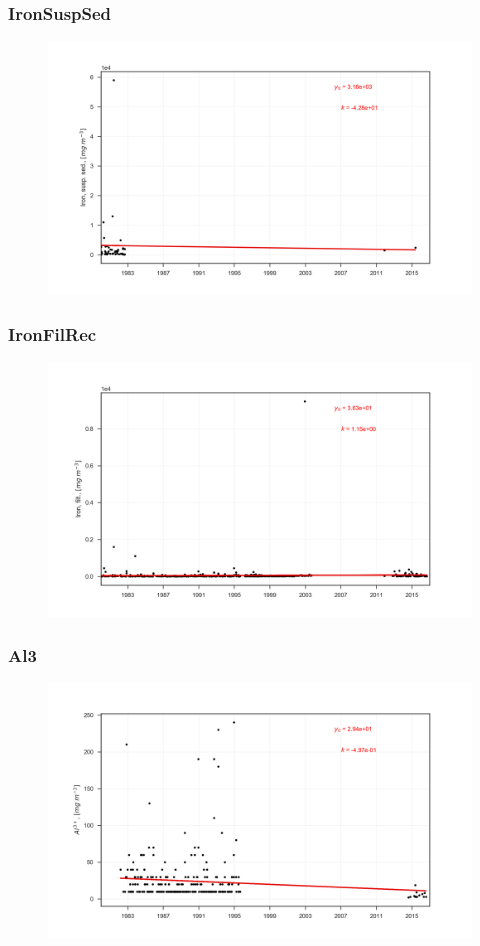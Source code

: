 \documentclass{beamer}
\begin{document}
\begin{frame}
\frametitle{IronSuspSed}
\begin{figure}
\includegraphics[width=\textwidth]{rivers/all/all_years/IronSuspSed.png}
\end{figure}
\end{frame}

\begin{frame}
\frametitle{IronFilRec}
\begin{figure}
\includegraphics[width=\textwidth]{rivers/all/all_years/IronFilRec.png}
\end{figure}
\end{frame}

\begin{frame}
\frametitle{Al3}
\begin{figure}
\includegraphics[width=\textwidth]{rivers/all/all_years/Al3.png}
\end{figure}
\end{frame}
\end{document}

